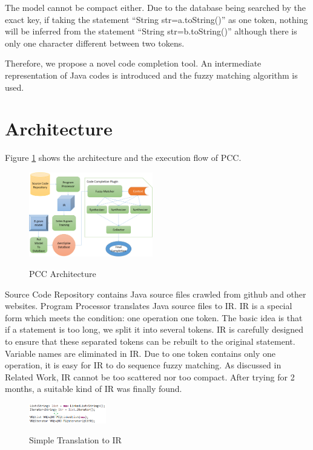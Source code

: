 \documentclass{sig-alternate-05-2015}
\begin{document}
The model cannot be compact either. Due to the database being searched by the exact key, if taking the statement ``String str=a.toString()'' as one token, nothing will be inferred from the statement ``String str=b.toString()'' although there is only one character different between two tokens.

Therefore, we propose a novel code completion tool. An intermediate representation of Java codes is introduced and the fuzzy matching algorithm is used.

\section{Architecture}

Figure \ref{architecture} shows the architecture and the execution flow of PCC.
\vspace{-0.25cm}
\\\begin{figure}[htbp]
  \centering
  \includegraphics[width=0.48\textwidth]{pics/architecture.png}\\
  \caption{PCC Architecture}\label{architecture}
\end{figure}

Source Code Repository contains Java source files crawled from github and other websites. Program Processor translates Java source files to IR. IR is a special form which meets the condition: one operation one token. The basic idea is that if a statement is too long, we split it into several tokens. IR is carefully designed to ensure that these separated tokens can be rebuilt to the original statement. Variable names are eliminated in IR. Due to one token contains only one operation, it is easy for IR to do sequence fuzzy matching. As discussed in Related Work, IR cannot be too scattered nor too compact. After trying for 2 months, a suitable kind of IR was finally found.
\vspace{-0.25cm}
\\\begin{figure}[htbp]
  \centering
  \includegraphics[width=0.3\textwidth]{pics/toIR1.png}\\
  \vspace{-0.15cm}
  \caption{Simple Translation to IR}\label{toIR1}
\end{figure}
\end{document}
